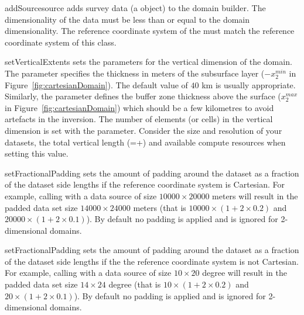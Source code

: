 \begin{methoddesc}[DomainBuilder]{addSource}{source}
adds survey data  (a  object) to the domain
builder. The dimensionality of the data must be less than or equal to the
domain dimensionality. The reference coordinate system of the 
must match the reference coordinate system of this class.
\end{methoddesc}

\begin{methoddesc}[DomainBuilder]{setVerticalExtents}{%
%
%
}
sets the parameters for the vertical dimension of the domain. The parameter
 specifies the thickness in meters of the subsurface layer
($-x_2^{min}$ in Figure~\ref{fig:cartesianDomain}).
The default value of $40$ km is usually appropriate. Similarly, the
 parameter defines the buffer zone thickness above the surface
($x_2^{max}$ in Figure~\ref{fig:cartesianDomain}) which should be a few
kilometres to avoid artefacts in the inversion.
The number of elements (or cells) in the vertical dimension is set with the
 parameter. Consider the size and resolution of your datasets,
the total vertical length (=+) and available
compute resources when setting this value.
\end{methoddesc}

\begin{methoddesc}[DomainBuilder]{setFractionalPadding}{%
%
}
sets the amount of padding around the dataset as a fraction of the dataset side
lengths if the reference coordinate system is Cartesian. 
For example, calling  with a data source
of size $10000 \times 20000$ meters will result in the padded data set size $14000 \times 24000$ meters
(that is $10000 \times (1+2 \times 0.2)$ and $20000 \times (1+2 \times 0.1)$).
By default no padding is applied and  is ignored for 2-dimensional
domains.
\end{methoddesc}

\begin{methoddesc}[DomainBuilder]{setFractionalPadding}{%
%
}
sets the amount of padding around the dataset as a fraction of the dataset side
lengths if the the reference coordinate system is not Cartesian.
For example, calling  with a data source
of size $10 \times 20$ degree will result in the padded data set size $14 \times 24$ degree
(that is $10 \times (1+2 \times 0.2)$ and $20 \times (1+2 \times 0.1)$).
By default no padding is applied and  is ignored for 2-dimensional
domains.
\end{methoddesc}

